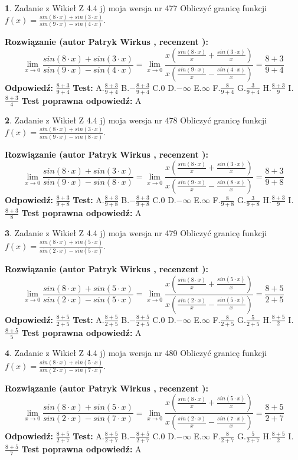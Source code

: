 \documentclass[12pt, a4paper]{article}
\theoremstyle{definition} %
\newtheorem{zad}{}
\newcommand{\zadStart}[1]{\begin{zad}#1\newline}
\newcommand{\zadStop}{\end{zad}}
\newcommand{\rozwStart}[2]{\noindent \textbf{Rozwiązanie (autor #1 , recenzent #2): }\newline}
\newcommand{\rozwStop}{\newline}
\newcommand{\odpStart}{\noindent \textbf{Odpowiedź:}\newline}
\newcommand{\odpStop}{\newline}
\newcommand{\testStart}{\noindent \textbf{Test:}\newline}
\newcommand{\testStop}{\newline}
\newcommand{\kluczStart}{\noindent \textbf{Test poprawna odpowiedź:}\newline}
\newcommand{\kluczStop}{\newline}
\begin{document}
\zadStart{Zadanie z Wikieł Z 4.4 j) moja wersja nr 477}
Obliczyć granicę funkcji $f(x)=\frac{sin(8\cdot x) +sin(3\cdot x)}{sin(9\cdot x) -sin(4\cdot x)}$.
\zadStop
\rozwStart{Patryk Wirkus}{}
$$\lim\limits_{x\to 0}\frac{sin(8\cdot x) +sin(3\cdot x)}{sin(9\cdot x) -sin(4\cdot x)}=\lim\limits_{x\to 0}\frac{x(\frac{sin(8\cdot x)}{x}+\frac{sin(3\cdot x)}{x})}{x(\frac{sin(9\cdot x)}{x}-\frac{sin(4\cdot x)}{x})}=\frac{8+3}{9+4}$$
\rozwStop
\odpStart
$\frac{8+3}{9+4}$
\odpStop
\testStart
A.$\frac{8+3}{9+4}$
B.$-\frac{8+3}{9+4}$
C.$0$
D.$-\infty$
E.$\infty$
F.$\frac{8}{9+4}$
G.$\frac{3}{9+4}$
H.$\frac{8+3}{9}$
I.$\frac{8+3}{4}$
\testStop
\kluczStart
A
\kluczStop



\zadStart{Zadanie z Wikieł Z 4.4 j) moja wersja nr 478}
Obliczyć granicę funkcji $f(x)=\frac{sin(8\cdot x) +sin(3\cdot x)}{sin(9\cdot x) -sin(8\cdot x)}$.
\zadStop
\rozwStart{Patryk Wirkus}{}
$$\lim\limits_{x\to 0}\frac{sin(8\cdot x) +sin(3\cdot x)}{sin(9\cdot x) -sin(8\cdot x)}=\lim\limits_{x\to 0}\frac{x(\frac{sin(8\cdot x)}{x}+\frac{sin(3\cdot x)}{x})}{x(\frac{sin(9\cdot x)}{x}-\frac{sin(8\cdot x)}{x})}=\frac{8+3}{9+8}$$
\rozwStop
\odpStart
$\frac{8+3}{9+8}$
\odpStop
\testStart
A.$\frac{8+3}{9+8}$
B.$-\frac{8+3}{9+8}$
C.$0$
D.$-\infty$
E.$\infty$
F.$\frac{8}{9+8}$
G.$\frac{3}{9+8}$
H.$\frac{8+3}{9}$
I.$\frac{8+3}{8}$
\testStop
\kluczStart
A
\kluczStop



\zadStart{Zadanie z Wikieł Z 4.4 j) moja wersja nr 479}
Obliczyć granicę funkcji $f(x)=\frac{sin(8\cdot x) +sin(5\cdot x)}{sin(2\cdot x) -sin(5\cdot x)}$.
\zadStop
\rozwStart{Patryk Wirkus}{}
$$\lim\limits_{x\to 0}\frac{sin(8\cdot x) +sin(5\cdot x)}{sin(2\cdot x) -sin(5\cdot x)}=\lim\limits_{x\to 0}\frac{x(\frac{sin(8\cdot x)}{x}+\frac{sin(5\cdot x)}{x})}{x(\frac{sin(2\cdot x)}{x}-\frac{sin(5\cdot x)}{x})}=\frac{8+5}{2+5}$$
\rozwStop
\odpStart
$\frac{8+5}{2+5}$
\odpStop
\testStart
A.$\frac{8+5}{2+5}$
B.$-\frac{8+5}{2+5}$
C.$0$
D.$-\infty$
E.$\infty$
F.$\frac{8}{2+5}$
G.$\frac{5}{2+5}$
H.$\frac{8+5}{2}$
I.$\frac{8+5}{5}$
\testStop
\kluczStart
A
\kluczStop



\zadStart{Zadanie z Wikieł Z 4.4 j) moja wersja nr 480}
Obliczyć granicę funkcji $f(x)=\frac{sin(8\cdot x) +sin(5\cdot x)}{sin(2\cdot x) -sin(7\cdot x)}$.
\zadStop
\rozwStart{Patryk Wirkus}{}
$$\lim\limits_{x\to 0}\frac{sin(8\cdot x) +sin(5\cdot x)}{sin(2\cdot x) -sin(7\cdot x)}=\lim\limits_{x\to 0}\frac{x(\frac{sin(8\cdot x)}{x}+\frac{sin(5\cdot x)}{x})}{x(\frac{sin(2\cdot x)}{x}-\frac{sin(7\cdot x)}{x})}=\frac{8+5}{2+7}$$
\rozwStop
\odpStart
$\frac{8+5}{2+7}$
\odpStop
\testStart
A.$\frac{8+5}{2+7}$
B.$-\frac{8+5}{2+7}$
C.$0$
D.$-\infty$
E.$\infty$
F.$\frac{8}{2+7}$
G.$\frac{5}{2+7}$
H.$\frac{8+5}{2}$
I.$\frac{8+5}{7}$
\testStop
\kluczStart
A
\kluczStop
\end{document}
